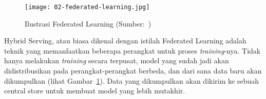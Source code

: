 \begin{figure}
  \centering
  \texttt{[image: 02-federated-learning.jpg]}
  \caption{Ilustrasi Federated Learning (Sumber:~\cite{book-handsonml})}\label{fig:federated-learning}
\end{figure}

Hybrid Serving, atau biasa dikenal dengan istilah Federated Learning adalah teknik yang memanfaatkan beberapa perangkat untuk proses \textit{training}-nya.
Tidak hanya melakukan \textit{training} secara terpusat, model yang sudah jadi akan didistribusikan pada perangkat-perangkat berbeda, dan dari sana data baru akan dikumpulkan (lihat Gambar~\ref{fig:federated-learning}).
Data yang dikumpulkan akan dikirim ke sebuah central store untuk membuat model yang lebih mutakhir.

